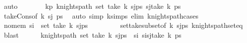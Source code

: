 \begin{isabellebody}
\ auto\isanewline
\ \ \ \ \isamarkupfalse%
\ \isamarkupfalse%
\ kp{\isacharcolon}{\kern0pt}\ {\isachardoublequoteopen}knights{\isacharunderscore}{\kern0pt}path\ {\isacharparenleft}{\kern0pt}set\ {\isacharparenleft}{\kern0pt}take\ {\isacharparenleft}{\kern0pt}k{\isacharminus}{\kern0pt}{}{\isacharparenright}{\kern0pt}\ {\isacharparenleft}{\kern0pt}s\isactrlsub j{\isacharhash}{\kern0pt}ps{\isacharparenright}{\kern0pt}{\isacharparenright}{\kern0pt}{\isacharparenright}{\kern0pt}\ {\isacharparenleft}{\kern0pt}s\isactrlsub j{\isacharhash}{\kern0pt}take\ {\isacharparenleft}{\kern0pt}k{\isacharminus}{\kern0pt}{}{\isacharparenright}{\kern0pt}\ ps{\isacharparenright}{\kern0pt}{\isachardoublequoteclose}\isanewline
\ \ \ \ \ \ \isamarkupfalse%
\ take{\isacharunderscore}{\kern0pt}Cons{\isacharprime}{\kern0pt}{\isacharbrackleft}{\kern0pt}of\ {\isachardoublequoteopen}k{\isacharminus}{\kern0pt}{}{\isachardoublequoteclose}\ s\isactrlsub j\ ps{\isacharbrackright}{\kern0pt}\ \isamarkupfalse%
\ {\isacharparenleft}{\kern0pt}auto\ simp{\isacharcolon}{\kern0pt}\ k{\isacharunderscore}{\kern0pt}simps\ elim{\isacharcolon}{\kern0pt}\ knights{\isacharunderscore}{\kern0pt}path{\isachardot}{\kern0pt}cases{\isacharparenright}{\kern0pt}\isanewline
\isanewline
\ \ \ \ \isamarkupfalse%
\ no{\isacharunderscore}{\kern0pt}mem{\isacharcolon}{\kern0pt}\ {\isachardoublequoteopen}s\isactrlsub i\ {\isasymnotin}\ set\ {\isacharparenleft}{\kern0pt}take\ {\isacharparenleft}{\kern0pt}k{\isacharminus}{\kern0pt}{}{\isacharparenright}{\kern0pt}\ {\isacharparenleft}{\kern0pt}s\isactrlsub j{\isacharhash}{\kern0pt}ps{\isacharparenright}{\kern0pt}{\isacharparenright}{\kern0pt}{\isachardoublequoteclose}\isanewline
\ \ \ \ \ \ \isamarkupfalse%
\ {}\ set{\isacharunderscore}{\kern0pt}take{\isacharunderscore}{\kern0pt}subset{\isacharbrackleft}{\kern0pt}of\ {\isachardoublequoteopen}k{\isacharminus}{\kern0pt}{}{\isachardoublequoteclose}\ {\isachardoublequoteopen}s\isactrlsub j{\isacharhash}{\kern0pt}ps{\isachardoublequoteclose}{\isacharbrackright}{\kern0pt}\ knights{\isacharunderscore}{\kern0pt}path{\isacharunderscore}{\kern0pt}set{\isacharunderscore}{\kern0pt}eq\ \isamarkupfalse%
\ blast\isanewline
\ \ \ \ \isamarkupfalse%
\ {\isachardoublequoteopen}knights{\isacharunderscore}{\kern0pt}path\ {\isacharparenleft}{\kern0pt}set\ {\isacharparenleft}{\kern0pt}take\ {\isacharparenleft}{\kern0pt}k{\isacharminus}{\kern0pt}{}{\isacharparenright}{\kern0pt}\ {\isacharparenleft}{\kern0pt}s\isactrlsub j{\isacharhash}{\kern0pt}ps{\isacharparenright}{\kern0pt}{\isacharparenright}{\kern0pt}\ {\isasymunion}\ {\isacharbraceleft}{\kern0pt}s\isactrlsub i{\isacharbraceright}{\kern0pt}{\isacharparenright}{\kern0pt}\ {\isacharparenleft}{\kern0pt}s\isactrlsub i{\isacharhash}{\kern0pt}s\isactrlsub j{\isacharhash}{\kern0pt}take\ {\isacharparenleft}{\kern0pt}k{\isacharminus}{\kern0pt}{}{\isacharparenright}{\kern0pt}\ ps{\isacharparenright}{\kern0pt}{\isachardoublequoteclose}\isanewline

\end{isabellebody}
